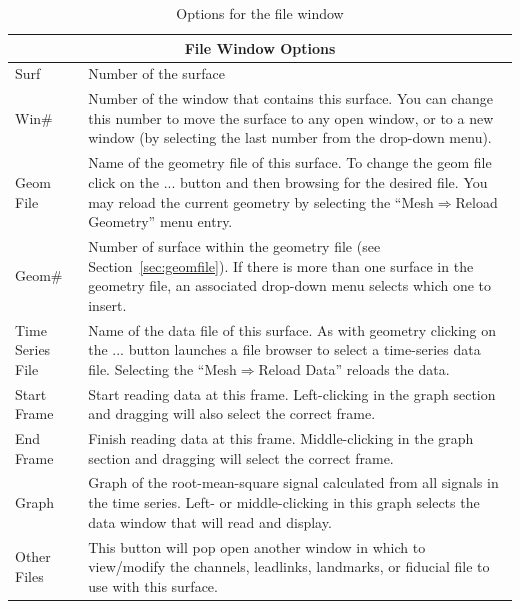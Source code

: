 \begin{table}[htbp]
\caption{\label{table:filewindow} Options for the file window}    
\begin{center}
\begin{tabular}{|l|p{4in}|} \hline
    \multicolumn{2}{|c|}{\textbf{File Window Options}} \\ \hline\hline
    Surf      &      Number of the surface \\ \hline
    Win\#      &      Number of the window that contains this surface.
          You can change this number to move the surface to any
          open window, or to a new window (by selecting the last
          number from the drop-down menu). \\ \hline
    Geom File &      Name of the geometry file of this surface.  To change
        the geom file click on the
        ... button and then browsing for the desired file. You may reload the
        current geometry by  
        selecting the ``Mesh$\Rightarrow$Reload Geometry'' 
        menu entry. \\ \hline
    Geom\#     &      Number of surface within the geometry file (see
         Section~\ref{sec:geomfile}). 
         If there is more than one surface in the geometry
         file, an associated drop-down  menu selects which one to 
         insert.   \\ \hline
    Time Series File      &   Name of the data file of this surface.
         As with geometry  clicking on the ... button launches 
         a file browser to select a time-series data file.
         Selecting the ``Mesh$\Rightarrow$Reload Data'' reloads
         the data. \\ \hline
    Start Frame           &   Start reading data at this frame. 
         Left-clicking 
         in the graph section and dragging will also  select the
         correct frame. \\ \hline
    End Frame             &       Finish reading data at this frame.
         Middle-clicking in the graph section and dragging 
         will  select the correct frame. \\ \hline 
    Graph     &       Graph of the root-mean-square signal calculated
         from all signals in the time series.    Left- or
         middle-clicking in this graph selects the data window that
         \map{} will read and display. \\ \hline 
    Other Files           &       This button will pop open another
         window in which to view/modify the channels, leadlinks, 
         landmarks, or fiducial file to use with this surface. \\ \hline 
\end{tabular}
\end{center}
\end{table}


